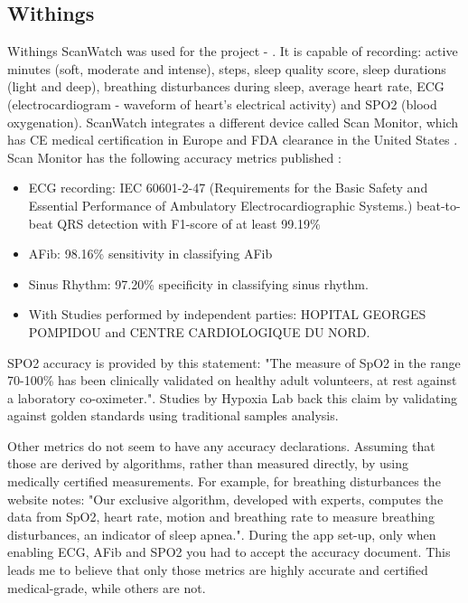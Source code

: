 \subsection{Withings}
\label{section:WithingsWatch}
Withings ScanWatch was used for the project - \cite{withingsStorePage}. It is capable of recording: active minutes (soft, moderate and intense), steps, sleep quality score, sleep durations (light and deep), breathing disturbances during sleep, average heart rate, ECG (electrocardiogram - waveform of heart's electrical activity) and SPO2 (blood oxygenation). ScanWatch integrates a different device called Scan Monitor, which has CE medical certification in Europe and FDA clearance in the United States \cite{withingsStorePage}.  Scan Monitor has the following accuracy metrics published \cite{scanMonitor}:
\begin{itemize}
    \item ECG recording: IEC 60601-2-47 (Requirements for the Basic Safety and Essential Performance of Ambulatory Electrocardiographic Systems.) beat-to-beat QRS detection with F1-score of at least 99.19\% 
    \item AFib: 98.16\% sensitivity in classifying AFib
    \item Sinus Rhythm: 97.20\% specificity in classifying sinus rhythm.
    \item With Studies performed by independent parties: HOPITAL GEORGES POMPIDOU and CENTRE CARDIOLOGIQUE DU NORD.
\end{itemize}
SPO2 accuracy is provided by this statement: "The measure of SpO2 in the range 70-100\% has been clinically validated on healthy adult volunteers, at rest against a laboratory co-oximeter.". Studies by Hypoxia Lab back this claim by validating against golden standards using traditional samples analysis.

Other metrics do not seem to have any accuracy declarations. Assuming that those are derived by algorithms, rather than measured directly, by using medically certified measurements. For example, for breathing disturbances the website notes: "Our exclusive algorithm, developed with experts, computes the data from SpO2, heart rate, motion and breathing rate to measure breathing disturbances, an indicator of sleep apnea.". During the app set-up, only when enabling ECG, AFib and SPO2 you had to accept the accuracy document. This leads me to believe that only those metrics are highly accurate and certified medical-grade, while others are not.


